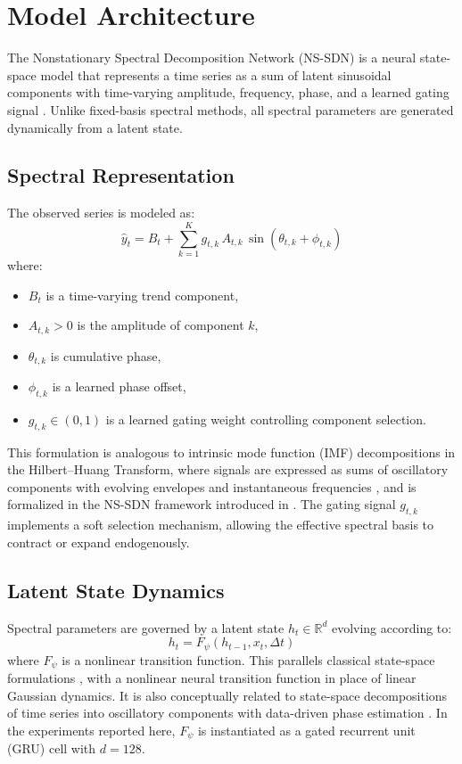 \section{Model Architecture}
The Nonstationary Spectral Decomposition Network (NS-SDN) is a neural state-space model that represents a time series as a sum of latent sinusoidal components with time-varying amplitude, frequency, phase, and a learned gating signal \cite{sunder2026nssdn}. Unlike fixed-basis spectral methods, all spectral parameters are generated dynamically from a latent state.

\subsection{Spectral Representation}
The observed series is modeled as:
\begin{equation}
\hat{y}_t = B_t + \sum_{k=1}^{K} g_{t,k}\, A_{t,k}\,\sin(\theta_{t,k} + \phi_{t,k})
\label{eq:synthesis}
\end{equation}
where:
\begin{itemize}
\item $B_t$ is a time-varying trend component,
\item $A_{t,k} > 0$ is the amplitude of component $k$,
\item $\theta_{t,k}$ is cumulative phase,
\item $\phi_{t,k}$ is a learned phase offset,
\item $g_{t,k} \in (0,1)$ is a learned gating weight controlling component selection.
\end{itemize}
This formulation is analogous to intrinsic mode function (IMF) decompositions in the Hilbert--Huang Transform, where signals are expressed as sums of oscillatory components with evolving envelopes and instantaneous frequencies \cite{huang1998empirical}, and is formalized in the NS-SDN framework introduced in \cite{sunder2026nssdn}. The gating signal $g_{t,k}$ implements a soft selection mechanism, allowing the effective spectral basis to contract or expand endogenously.

\subsection{Latent State Dynamics}
Spectral parameters are governed by a latent state $h_t \in \mathbb{R}^d$ evolving according to:
\begin{equation}
h_t = F_{\psi}(h_{t-1}, x_t, \Delta t)
\end{equation}
where $F_{\psi}$ is a nonlinear transition function. This parallels classical state-space formulations \cite{durbin2012time}, with a nonlinear neural transition function \cite{rangapuramdeep} in place of linear Gaussian dynamics. It is also conceptually related to state-space decompositions of time series into oscillatory components with data-driven phase estimation \cite{matsuda2016oscillation}. In the experiments reported here, $F_{\psi}$ is instantiated as a gated recurrent unit (GRU) cell \cite{cho2014learningphrase} with $d = 128$.

